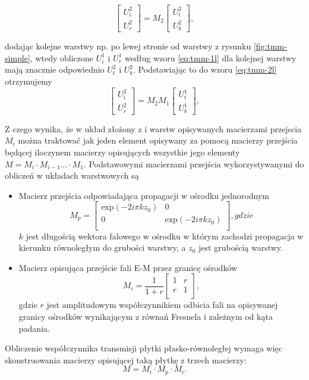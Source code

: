 \begin{equation}
	\begin{bmatrix}
	U_i^2 \\ 
	U_r^2
	\end{bmatrix}
	= M_2 
	\begin{bmatrix}
	U_t^2 \\
	U_b^2
	\end{bmatrix},
\label{eq:tmm-2l}
\end{equation}

dodając kolejne warstwy np. po lewej stronie od warstwy z rysunku \ref{fig:tmm-simple}, wtedy obliczone $U_i^1$ i $U_r^1$ według wzoru \ref{eq:tmm-1l} dla kolejnej warstwy mają znacznie odpowiednio $U_t^2$ i $U_b^2$. Podstawiając to do wzoru \ref{eq:tmm-2l} otrzymujemy 
\begin{equation}
\begin{bmatrix}
U_i^2 \\ 
U_r^2
\end{bmatrix}
=M_2 M_1 
\begin{bmatrix}
U_t^1 \\
U_b^1
\end{bmatrix},
\label{eq:tmm-2ls}
\end{equation}

Z czego wynika, że w układ złożony z i warstw opisywanych macierzami przejscia $M_i$ można traktować jak jeden element opisywany za pomocą macierzy przejścia będącej iloczynem macierzy opisujących wszystkie jego elementy $M= M_i \cdot M_{i-1} ... \cdot M_1$. Podstawowymi macierzami przejścia wykorzystywanymi do obliczeń w układach warstwowych są
\begin{itemize}
\item Macierz przejścia odpowiadająca propagacji w ośrodku jednorodnym 
\begin{equation}
	M_p=
	\begin{bmatrix}
	\textrm{exp}(-2i\pi k z_0) & 0 \\
	0	&\textrm{exp}(-2i\pi k z_0)\\
	\end{bmatrix},gdzie
\end{equation}
$k$ jest długością wektora falowego w ośrodku w którym zachodzi propagacja w kierunku równoległym do grubości warstwy, a $z_0$ jest grubością warstwy.
\item Macierz opisująca przejście fali E-M przez granicę ośrodków
\begin{equation}
	M_i=\frac{1}{1+r}
	\begin{bmatrix}
	1 & r \\
	r & 1\\
	\end{bmatrix},
\end{equation}
gdzie $r$ jest amplitudowym współczynnikiem odbicia fali na opisywanej granicy ośrodków wynikającym z równań Fresnela i zależnym od kąta padania. 
\end{itemize}

Obliczenie współczynnika transmisji płytki płasko-równoległej wymaga więc skonstruowania macierzy opisującej taką płytkę z trzech macierzy: 
\[
M=M_i \cdot M_p \cdot  M_i.
\]
